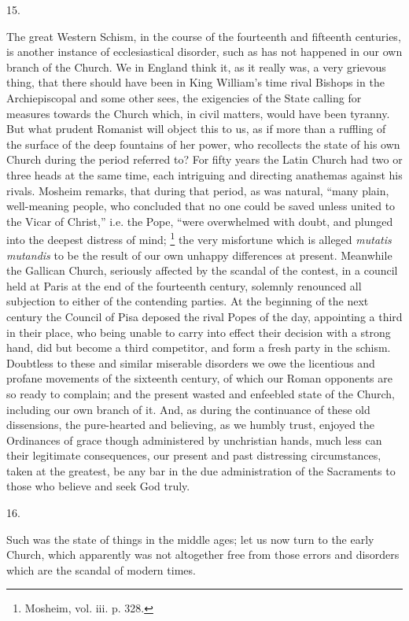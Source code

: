 15.

The great Western Schism, in the course of the fourteenth and
fifteenth centuries, is another instance of ecclesiastical disorder, such as has not happened in our own branch of the Church. We
in England think it, as it really was, a very grievous thing, that
there should have been in King William's time rival Bishops in the
Archiepiscopal and some other sees, the exigencies of the State
calling for measures towards the Church which, in civil matters, would
have been tyranny. But what prudent Romanist will object this to us,
as if more than a ruffling of the surface of the deep fountains of her
power, who recollects the state of his own Church during the period
referred to? For fifty years the Latin Church had two or three heads
at the same time, each intriguing and directing anathemas against his
rivals. Mosheim remarks, that during that period, as was natural,
``many plain, well-meaning people, who concluded that no one could
be saved unless united to the Vicar of Christ,'' i.e. the Pope,
``were overwhelmed with doubt, and plunged into the deepest
distress of mind; \footnote{Mosheim, vol. iii. p. 328.} the
very misfortune which is alleged \emph{mutatis mutandis} to be the
result of our own unhappy differences at present. Meanwhile the
Gallican Church, seriously affected by the scandal of the contest, in
a council held at Paris at the end of the fourteenth century, solemnly
renounced all subjection to either of the contending parties. At the
beginning of the next century the Council of Pisa deposed the rival
Popes of the day, appointing a third in their place, who being unable
to carry into effect their decision with a strong hand, did but become
a third competitor, and form a fresh party in the schism. Doubtless to
these and similar miserable disorders we owe the licentious and
profane movements of the sixteenth century, of which our Roman
opponents are so ready to complain; and the present wasted and
enfeebled state of the Church, including our own branch of it. And, as
during the continuance of these old dissensions, the
pure-hearted and believing, as we humbly trust, enjoyed the Ordinances
of grace though administered by unchristian hands, much less can their
legitimate consequences, our present and past distressing
circumstances, taken at the greatest, be any bar in the due
administration of the Sacraments to those who believe and seek God
truly.

16.

Such was the state of things in the middle ages; let us now turn to
the early Church, which apparently was not altogether free from those
errors and disorders which are the scandal of modern times.

